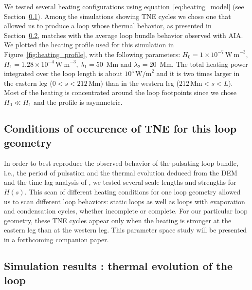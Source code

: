 \documentclass[preprint2]{aastex6}
\begin{document}
We tested several heating configurations using equation~\ref{eq:heating_model} (see Section~\ref{sec:paperb}). Among the simulations showing TNE cycles we chose one that allowed us to produce a loop whose thermal behavior, as presented in Section~\ref{simu_thermal_behavior}, matches with the average loop bundle behavior observed with AIA.
We plotted the heating profile used for this simulation in Figure~\ref{fig:heating_profile}, with the following parameters: $H_0=1 \times 10^{-7} \, \mathrm{W~m}^{-3}$, $H_1=1.28 \times 10^{-4} \, \mathrm{W~m}^{-3}$, $\lambda_1=50 $~Mm and $\lambda_2=20$~Mm. The total heating power integrated over the loop length is about $10^5 \, \mathrm{W/m}^2$ and it is two times larger in the eastern leg ($0  < s < 212 \, \mathrm{Mm}$) than in the western leg ($212\, \mathrm{Mm} < s < L $). 
Most of the heating is concentrated around the loop footpoints since we chose $H_0 \ll H_1$ and the profile is asymmetric. 

\subsection{Conditions of occurence of TNE for this loop geometry}\label{sec:paperb}

In order to best reproduce the observed behavior of the pulsating loop bundle, i.e., the period of pulsation and the thermal evolution deduced from the DEM and the time lag analysis of \citet{froment2015}, we tested several scale lengths and strengths for $H(s)$. This scan of different heating conditions for one loop geometry allowed us to scan different loop behaviors: static loops as well as loops with evaporation and condensation cycles, whether incomplete or complete. For our particular loop geometry, these TNE cycles appear only when the heating is stronger at the eastern leg than at the western leg. This parameter space study will be presented in a forthcoming companion paper.


\subsection{Simulation results : thermal evolution of the loop}\label{simu_thermal_behavior}

\end{document}
